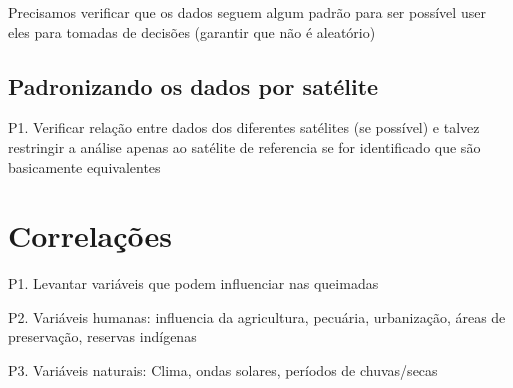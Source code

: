 \documentclass[cic,tc]{iiufrgs}
\begin{document}
Precisamos verificar que os dados seguem algum padrão para ser possível
user eles para tomadas de decisões (garantir que não é aleatório) 
\cite[Point Pattern Analysis]{geographicDataSciencePython} \par

\section{Padronizando os dados por satélite}

P1. Verificar relação entre dados dos diferentes satélites (se possível) e talvez restringir a análise apenas ao satélite de referencia se for identificado que são basicamente equivalentes \par

\chapter{Correlações}

P1. Levantar variáveis que podem influenciar nas queimadas \par
P2. Variáveis humanas: influencia da agricultura, pecuária, 
urbanização, áreas de preservação, reservas indígenas \par
P3. Variáveis naturais: Clima, ondas solares, períodos de chuvas/secas \par





\end{document}
